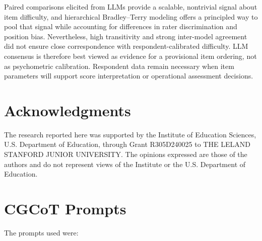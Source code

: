 \documentclass[11pt]{article}
\begin{document}
Paired comparisons elicited from LLMs provide a scalable, nontrivial signal about item difficulty, and hierarchical Bradley--Terry modeling offers a principled way to pool that signal while accounting for differences in rater discrimination and position bias. Nevertheless, high transitivity and strong inter-model agreement did not ensure close correspondence with respondent-calibrated difficulty. LLM consensus is therefore best viewed as evidence for a provisional item ordering, not as psychometric calibration. Respondent data remain necessary when item parameters will support score interpretation or operational assessment decisions.

\section*{Acknowledgments}
\label{sec:acknowledgments}

The research reported here was supported by the Institute of Education Sciences, U.S. Department of Education, through Grant R305D240025 to THE LELAND STANFORD JUNIOR UNIVERSITY. The opinions expressed are those of the authors and do not represent views of the Institute or the U.S. Department of Education.





\appendix

\section{CGCoT Prompts}
\label{app:prompts}
The prompts used were:  
\end{document}
